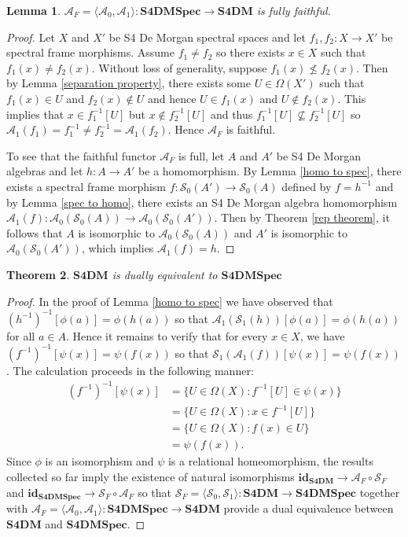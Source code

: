 \documentclass{amsart}
\theoremstyle{plain}
\newtheorem{theorem}{Theorem}[section]
\newtheorem{lemma}[theorem]{Lemma}
\theoremstyle{definition}
\begin{document}
\begin{lemma}\label{fully faithful 2}
    $\mathcal{A}_F=\langle \mathcal{A}_0,\mathcal{A}_1\rangle\colon\mathbf{S4DMSpec}\to\mathbf{S4DM}$ is fully faithful. 
\end{lemma}
\begin{proof}
    Let $X$ and $X'$ be S4 De Morgan spectral spaces and let $f_1,f_2\colon X\to X'$ be spectral frame morphisms. Assume $f_1\not=f_2$ so there exists $x\in X$ such that $f_1(x)\not= f_2(x)$. Without loss of generality, suppose $f_1(x)\not\leqslant f_2(x)$. Then by Lemma \ref{separation property}, there exists some $U\in\Omega(X')$ such that $f_1(x)\in U$ and $f_2(x)\not\in U$ and hence $U\in f_1(x)$ and $U\not\in f_2(x)$. This implies that $x\in f_1^{-1}[U]$ but $x\not\in f_2^{-1}[U]$ and thus $f_1^{-1}[U]\not\subseteq f_2^{-1}[U]$ so $\mathcal{A}_1(f_1)=f_1^{-1}\not= f_2^{-1}=\mathcal{A}_1(f_2)$. Hence $\mathcal{A}_F$ is faithful. 

    To see that the faithful functor $\mathcal{A}_F$ is full, let $A$ and $A'$ be S4 De Morgan algebras and let $h\colon A\to A'$ be a homomorphism. By Lemma \ref{homo to spec}, there exists a spectral frame morphism $f\colon\mathcal{S}_0(A')\to\mathcal{S}_0(A)$ defined by $f=h^{-1}$ and by Lemma \ref{spec to homo}, there exists an S4 De Morgan algebra homomorphism $\mathcal{A}_1(f)\colon\mathcal{A}_0(\mathcal{S}_0(A))\to\mathcal{A}_0(\mathcal{S}_0(A'))$. Then by Theorem \ref{rep theorem}, it follows that $A$ is isomorphic to $\mathcal{A}_0(\mathcal{S}_0(A))$ and $A'$ is isomorphic to $\mathcal{A}_0(\mathcal{S}_0(A'))$, which implies $\mathcal{A}_1(f)=h$. 
\end{proof}
\begin{theorem}\label{duality}
    $\mathbf{S4DM}$ is dually equivalent to $\mathbf{S4DMSpec}$
\end{theorem}
\begin{proof}
   In the proof of Lemma \ref{homo to spec} we have observed that $(h^{-1})^{-1}[\phi(a)]=\phi(h(a))$ so that $\mathcal{A}_1(\mathcal{S}_1(h))[\phi(a)]=\phi(h(a))$ for all $a\in A$. Hence it remains to verify that for every $x\in X$, we have $(f^{-1})^{-1}[\psi(x)]=\psi(f(x))$ so that $\mathcal{S}_1(\mathcal{A}_1(f))[\psi(x)]=\psi(f(x))$. The calculation proceeds in the following manner: 
\begin{align*}
    (f^{-1})^{-1}[\psi(x)]&=\{U\in\Omega(X):f^{-1}[U]\in\psi(x)\}
    \\&=\{U\in\Omega(X):x\in f^{-1}[U]\}
    \\&=\{U\in\Omega(X):f(x)\in U\}
    \\&=\psi(f(x)). 
\end{align*} 
Since $\phi$ is an isomorphism and $\psi$ is a relational homeomorphism, the results collected so far imply the existence of natural isomorphisms $\mathbf{id}_{\mathbf{S4DM}}\to\mathcal{A}_F\circ\mathcal{S}_F$ and $\mathbf{id}_{\mathbf{S4DMSpec}}\to\mathcal{S}_F\circ\mathcal{A}_F$ so that $\mathcal{S}_F=\langle \mathcal{S}_0,\mathcal{S}_1\rangle\colon\mathbf{S4DM}\to\mathbf{S4DMSpec}$ together with $\mathcal{A}_F=\langle \mathcal{A}_0,\mathcal{A}_1\rangle\colon\mathbf{S4DMSpec}\to\mathbf{S4DM}$ provide a dual equivalence between $\mathbf{S4DM}$ and $\mathbf{S4DMSpec}$.  
\end{proof}
\end{document}
